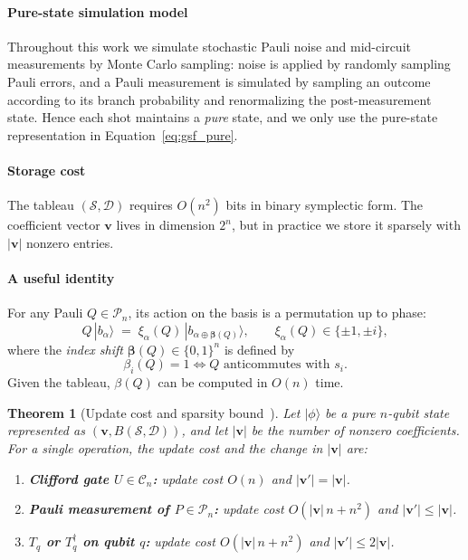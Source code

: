 \documentclass[10pt,conference]{IEEEtran}
\newtheorem{theorem}{Theorem}
\begin{document}
\paragraph{Pure-state simulation model}
Throughout this work we simulate stochastic Pauli noise and mid-circuit measurements by Monte Carlo sampling: 
noise is applied by randomly sampling Pauli errors, and a Pauli measurement is simulated by sampling an outcome according to its branch probability and renormalizing the post-measurement state.
Hence each shot maintains a \emph{pure} state, and we only use the pure-state representation in Equation~\eqref{eq:gsf_pure}.

\paragraph{Storage cost}
The tableau $(\mathcal{S},\mathcal{D})$ requires $O(n^2)$ bits in binary symplectic form.
The coefficient vector $\mathbf{v}$ lives in dimension $2^n$, but in practice we store it sparsely with $|\mathbf{v}|$ nonzero entries.

\paragraph{A useful identity}
For any Pauli $Q\in\mathcal{P}_n$, its action on the basis is a permutation up to phase:
\begin{equation}
\label{eq:pauli_on_basis}
Q\,|b_\alpha\rangle \;=\; \xi_{\alpha}(Q)\,|b_{\alpha\oplus \mathbf{\beta}(Q)}\rangle,
\qquad \xi_{\alpha}(Q)\in\{\pm 1,\pm i\},
\end{equation}
where the \emph{index shift} $\mathbf{\beta}(Q)\in\{0,1\}^n$ is defined by
\[
\beta_i(Q)=1 \iff Q \text{ anticommutes with } s_i.
\]
Given the tableau, $\beta(Q)$ can be computed in $O(n)$ time.

\begin{theorem}[Update cost and sparsity bound~\cite{yoder2012generalization}]
\label{thm:complexity}
Let $|\phi\rangle$ be a pure $n$-qubit state represented as $(\mathbf{v},B(\mathcal{S},\mathcal{D}))$, and let $|\mathbf{v}|$ be the number of nonzero coefficients.
For a single operation, the update cost and the change in $|\mathbf{v}|$ are:
\begin{enumerate}
    \item \textbf{Clifford gate $U\in\mathcal{C}_n$:} update cost $O(n)$ and $|\mathbf{v}'|=|\mathbf{v}|$.
    \item \textbf{Pauli measurement of $P\in\mathcal{P}_n$:} update cost $O(|\mathbf{v}|\,n+n^2)$ and $|\mathbf{v}'|\le |\mathbf{v}|$.
    \item \textbf{$T_q$ or $T_q^\dagger$ on qubit $q$:} update cost $O(|\mathbf{v}|\,n+n^2)$ and $|\mathbf{v}'|\le 2|\mathbf{v}|$.
\end{enumerate}
\end{theorem}
\end{document}

